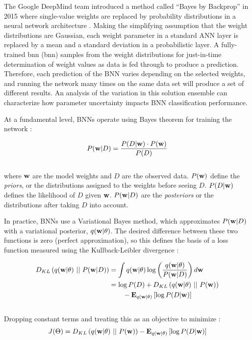 The Google DeepMind team introduced a method called ``Bayes by Backprop'' in 2015 where single-value weights are replaced by probability distributions in a neural network architecture \citep{blundell_weight_2015}. Making the simplifying assumption that the weight distributions are Gaussian, each weight parameter in a standard ANN layer is replaced by a mean and a standard deviation in a probabilistic layer. A fully-trained \acrlong{bnn} (\acrshort{bnn}) samples from the weight distributions for just-in-time determination of weight values as data is fed through to produce a prediction. Therefore, each prediction of the BNN varies depending on the selected weights, and running the network many times on the same data set will produce a set of different results. An analysis of the variation in this solution ensemble can characterize how parameter uncertainty impacts BNN classification performance.

At a fundamental level, BNNs operate using Bayes theorem for training the network \citep{webster_probabilistic_2021}:

\begin{equation}
    \label{eq:bayesrule}
    P({\bf w} \vert D) = \frac{P(D \vert {\bf w}) \cdot P({\bf w})}{P(D)}
\end{equation}
\\
where ${\bf w}$ are the model weights and $D$ are the observed data. $P({\bf w})$ define the \textit{priors}, or the distributions assigned to the weights before seeing $D$. $P(D \vert {\bf w})$ defines the likelihood of $D$ given ${\bf w}$. $P({\bf w} \vert D)$ are the \textit{posteriors} or the distributions after taking $D$ into account.

In practice, BNNs use a Variational Bayes method, which approximates $P({\bf w} \vert D)$ with a variational posterior, $q({\bf w} \vert \theta)$. The desired difference between these two functions is zero (perfect approximation), so this defines the basis of a loss function measured using the Kullback-Leibler divergence \citep{webster_probabilistic_2021}:

\begin{equation}
    \label{eq:bnn_loss}
    \begin{aligned}
    D_{KL}\left(q({\bf w} \vert \theta)\ \vert\vert\ P({\bf w} \vert D)\right) &= \int{q({\bf w} \vert \theta) \log \left({\frac{q({\bf w} \vert \theta)}{P({\bf w} \vert D)}}\right) d{\bf w}} \\
    &= \log P(D) + D_{KL}\left(q({\bf w} \vert \theta)\ \vert\vert\ P({\bf w})\right) \\ 
    &\qquad- \mathbf{E}_{q({\bf w} \vert \theta)}\left[\log P(D \vert {\bf w})\right]
    \end{aligned}
\end{equation}
\\
Dropping constant terms and treating this as an objective to minimize \citep{blundell_weight_2015}:
\begin{equation}
    \label{eq:bnn_objective}
    J(\Theta) = D_{KL}\left(q({\bf w} \vert \theta)\ \vert\vert\ P({\bf w})\right) - \mathbf{E}_{q({\bf w} \vert \theta)}\left[\log P(D \vert {\bf w})\right]
\end{equation}

